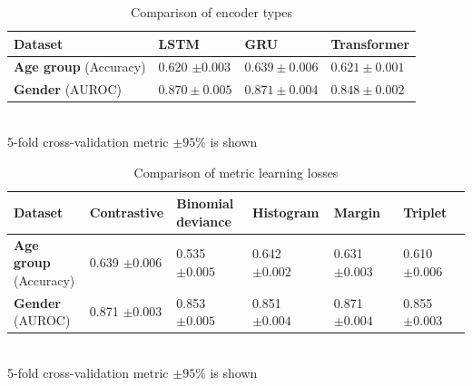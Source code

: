 \documentclass{article}
\begin{document}
\begin{table}
\centering
\caption{Comparison of encoder types}
\begin{tabular}{llll}
\toprule
\textbf{Dataset} & \textbf{LSTM} & \textbf{GRU} & \textbf{Transformer} \\
\midrule
\textbf{Age group} \small{(Accuracy)} & 0.620 $\pm 0.003$ & $0.639 \pm 0.006$ & $0.621 \pm 0.001$ \\
\textbf{Gender} \small{(AUROC)} & $0.870 \pm 0.005$ & $0.871 \pm 0.004$ & $0.848 \pm 0.002$  \\
\bottomrule
\end{tabular} \\
\small{5-fold cross-validation metric $\pm 95\%$ is shown}
\label{tab-enc-type}
\end{table}

\begin{table}
\centering
\caption{Comparison of metric learning losses}
\begin{tabular}{llllll}
\toprule
\textbf{Dataset} & \textbf{Contrastive} & \makecell{\textbf{Binomial} \\ \textbf{deviance}} & \textbf{Histogram} & \textbf{Margin} & \textbf{Triplet} \\
\midrule
\makecell{\textbf{Age group} \\ \small{(Accuracy)}} & \makecell{0.639 \\ $\pm 0.006$} & \makecell{0.535 \\ $\pm 0.005$} & \makecell{0.642 \\ $\pm 0.002$} & \makecell{0.631 \\ $\pm 0.003$} & \makecell{0.610 \\ $\pm 0.006$} \\
\makecell{\textbf{Gender} \\ \small{(AUROC)}} & \makecell{0.871 \\ $\pm 0.003$} & \makecell{0.853 \\ $\pm 0.005$} & \makecell{0.851 \\ $\pm 0.004$} & \makecell{0.871 \\ $\pm 0.004$} & \makecell{0.855 \\ $\pm 0.003$} \\
\bottomrule
\end{tabular} \\
\small{5-fold cross-validation metric $\pm 95\%$ is shown}
\label{tab-loss-type}
\end{table}
\end{document}
